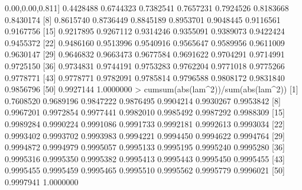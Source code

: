 \documentclass[
]{article}
\newenvironment{Shaded}{\begin{snugshade}}{\end{snugshade}}
\newcommand{\DecValTok}[1]{\textcolor[rgb]{0.00,0.00,0.81}{#1}}
\newcommand{\FloatTok}[1]{\textcolor[rgb]{0.00,0.00,0.81}{#1}}
\newcommand{\FunctionTok}[1]{\textcolor[rgb]{0.00,0.00,0.00}{#1}}
\newcommand{\NormalTok}[1]{#1}
\newcommand{\SpecialCharTok}[1]{\textcolor[rgb]{0.00,0.00,0.00}{#1}}
\begin{document}
\begin{Shaded}
\begin{Highlighting}[]
\NormalTok{ [}\DecValTok{1}\NormalTok{] }\FloatTok{0.4428488} \FloatTok{0.6744323} \FloatTok{0.7382541} \FloatTok{0.7657231} \FloatTok{0.7924526} \FloatTok{0.8183668} \FloatTok{0.8430174}
\NormalTok{ [}\DecValTok{8}\NormalTok{] }\FloatTok{0.8615740} \FloatTok{0.8736449} \FloatTok{0.8845189} \FloatTok{0.8953701} \FloatTok{0.9048445} \FloatTok{0.9116561} \FloatTok{0.9167756}
\NormalTok{[}\DecValTok{15}\NormalTok{] }\FloatTok{0.9217895} \FloatTok{0.9267112} \FloatTok{0.9314246} \FloatTok{0.9355091} \FloatTok{0.9389073} \FloatTok{0.9422424} \FloatTok{0.9455372}
\NormalTok{[}\DecValTok{22}\NormalTok{] }\FloatTok{0.9486160} \FloatTok{0.9513996} \FloatTok{0.9540916} \FloatTok{0.9565647} \FloatTok{0.9589956} \FloatTok{0.9611009} \FloatTok{0.9630147}
\NormalTok{[}\DecValTok{29}\NormalTok{] }\FloatTok{0.9646832} \FloatTok{0.9663473} \FloatTok{0.9677584} \FloatTok{0.9691622} \FloatTok{0.9704291} \FloatTok{0.9714991} \FloatTok{0.9725150}
\NormalTok{[}\DecValTok{36}\NormalTok{] }\FloatTok{0.9734831} \FloatTok{0.9744191} \FloatTok{0.9753283} \FloatTok{0.9762204} \FloatTok{0.9771018} \FloatTok{0.9775266} \FloatTok{0.9778771}
\NormalTok{[}\DecValTok{43}\NormalTok{] }\FloatTok{0.9778771} \FloatTok{0.9782091} \FloatTok{0.9785814} \FloatTok{0.9796588} \FloatTok{0.9808172} \FloatTok{0.9831840} \FloatTok{0.9856796}
\NormalTok{[}\DecValTok{50}\NormalTok{] }\FloatTok{0.9927144} \FloatTok{1.0000000}
\SpecialCharTok{\textgreater{}} \FunctionTok{cumsum}\NormalTok{(}\FunctionTok{abs}\NormalTok{(lam}\SpecialCharTok{\^{}}\DecValTok{2}\NormalTok{))}\SpecialCharTok{/}\FunctionTok{sum}\NormalTok{(}\FunctionTok{abs}\NormalTok{(lam}\SpecialCharTok{\^{}}\DecValTok{2}\NormalTok{))}
\NormalTok{ [}\DecValTok{1}\NormalTok{] }\FloatTok{0.7608520} \FloatTok{0.9689196} \FloatTok{0.9847222} \FloatTok{0.9876495} \FloatTok{0.9904214} \FloatTok{0.9930267} \FloatTok{0.9953842}
\NormalTok{ [}\DecValTok{8}\NormalTok{] }\FloatTok{0.9967201} \FloatTok{0.9972854} \FloatTok{0.9977441} \FloatTok{0.9982010} \FloatTok{0.9985492} \FloatTok{0.9987292} \FloatTok{0.9988309}
\NormalTok{[}\DecValTok{15}\NormalTok{] }\FloatTok{0.9989284} \FloatTok{0.9990224} \FloatTok{0.9991086} \FloatTok{0.9991733} \FloatTok{0.9992181} \FloatTok{0.9992613} \FloatTok{0.9993034}
\NormalTok{[}\DecValTok{22}\NormalTok{] }\FloatTok{0.9993402} \FloatTok{0.9993702} \FloatTok{0.9993983} \FloatTok{0.9994221} \FloatTok{0.9994450} \FloatTok{0.9994622} \FloatTok{0.9994764}
\NormalTok{[}\DecValTok{29}\NormalTok{] }\FloatTok{0.9994872} \FloatTok{0.9994979} \FloatTok{0.9995057} \FloatTok{0.9995133} \FloatTok{0.9995195} \FloatTok{0.9995240} \FloatTok{0.9995280}
\NormalTok{[}\DecValTok{36}\NormalTok{] }\FloatTok{0.9995316} \FloatTok{0.9995350} \FloatTok{0.9995382} \FloatTok{0.9995413} \FloatTok{0.9995443} \FloatTok{0.9995450} \FloatTok{0.9995455}
\NormalTok{[}\DecValTok{43}\NormalTok{] }\FloatTok{0.9995455} \FloatTok{0.9995459} \FloatTok{0.9995465} \FloatTok{0.9995510} \FloatTok{0.9995562} \FloatTok{0.9995779} \FloatTok{0.9996021}
\NormalTok{[}\DecValTok{50}\NormalTok{] }\FloatTok{0.9997941} \FloatTok{1.0000000}
\end{Highlighting}
\end{Shaded}
\end{document}
